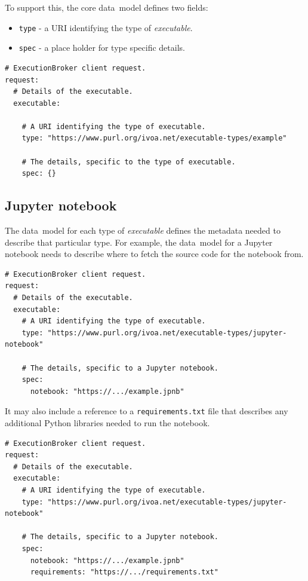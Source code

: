 \documentclass[11pt,a4paper]{ivoa}
\newcommand{\datamodel} {data~model}
\newcommand{\jupyternotebook} {Jupyter notebook}
\newcommand{\python} {Python}
\newcommand{\codeword}[1] {\texttt{#1}}
\newcommand{\executable} {\textit{executable}}
\begin{document}
To support this, the core \datamodel{} defines two fields:
\begin{itemize}
  \item \codeword{type} - a URI identifying the type of \executable{}.
  \item \codeword{spec} - a place holder for type specific details.
\end{itemize}

\begin{lstlisting}[]
# ExecutionBroker client request.
request:
  # Details of the executable.
  executable:

    # A URI identifying the type of executable.
    type: "https://www.purl.org/ivoa.net/executable-types/example"

    # The details, specific to the type of executable.
    spec: {}
\end{lstlisting}

\subsection{\jupyternotebook{}}
\label{jupyternotebook}
The \datamodel{} for each type of \executable{} defines the metadata needed to
describe that particular type.
For example, the \datamodel{} for a \jupyternotebook{} needs to describe where
to fetch the source code for the notebook from.

\begin{lstlisting}[]
# ExecutionBroker client request.
request:
  # Details of the executable.
  executable:
    # A URI identifying the type of executable.
    type: "https://www.purl.org/ivoa.net/executable-types/jupyter-notebook"

    # The details, specific to a Jupyter notebook.
    spec:
      notebook: "https://.../example.jpnb"
\end{lstlisting}

It may also include a reference to a \codeword{requirements.txt} file that describes any additional \python{}
libraries needed to run the notebook.
\begin{lstlisting}[]
# ExecutionBroker client request.
request:
  # Details of the executable.
  executable:
    # A URI identifying the type of executable.
    type: "https://www.purl.org/ivoa.net/executable-types/jupyter-notebook"

    # The details, specific to a Jupyter notebook.
    spec:
      notebook: "https://.../example.jpnb"
      requirements: "https://.../requirements.txt"
\end{lstlisting}
\end{document}
